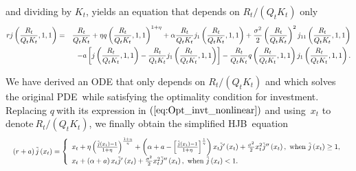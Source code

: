 \documentclass[12pt, a4paper]{article}
\begin{document}
and dividing by $K_{t}$, yields an equation that depends on $R_{t}/\left( Q_{t}K_{t}\right) $ only
{ \footnotesize
\begin{eqnarray*}
rj\left( \frac{R_{t}}{Q_{t}K_{t}},1,1\right)  &=&\frac{R_{t}}{Q_{t}K_{t}}%
+\eta q\left( \frac{R_{t}}{Q_{t}K_{t}},1,1\right) ^{1+\eta }+\alpha \frac{%
R_{t}}{Q_{t}K_{t}}j_{1}\left( \frac{R_{t}}{Q_{t}K_{t}},1,1\right) +\frac{%
\sigma ^{2}}{2}\left( \frac{R_{t}}{Q_{t}K_{t}}\right) ^{2}j_{11}\left( \frac{%
R_{t}}{Q_{t}K_{t}},1,1\right)  \\
&&-a\left[ j\left( \frac{R_{t}}{Q_{t}K_{t}},1,1\right) -\frac{R_{t}}{%
Q_{t}K_{t}}j_{1}\left( \frac{R_{t}}{Q_{t}K_{t}},1,1\right) \right] -\frac{%
R_{t}}{Q_{t}K_{t}}q\left( \frac{R_{t}}{Q_{t}K_{t}},1,1\right) j_{1}\left(
\frac{R_{t}}{Q_{t}K_{t}},1,1\right) .
\end{eqnarray*}
}

We have derived an ODE that only depends on $R_{t}/\left( Q_{t}K_{t}\right) $
and which solves the original PDE\ while satisfying the optimality condition
for investment. Replacing $q\ $with its expression in $\left( \ref%
{eq:Opt_invt_nonlinear}\right) $ and using\ $x_{t}$ to denote$\ R_{t}/\left(
Q_{t}K_{t}\right) $, we finally obtain the simplified HJB\ equation%
\begin{equation*}
\resizebox{\textwidth}{!}
{$
\left( r+a\right) \tilde{j}\left( x_{t}\right) =\left\{
\begin{array}{l}
x_{t}+\eta \left( \frac{\tilde{j}\left( x_{t}\right) -1}{1+\eta }\right) ^{%
\frac{1+\eta }{\eta }}+\left( \alpha +a-\left[ \frac{\tilde{j}\left(
x_{t}\right) -1}{1+\eta }\right] ^{\frac{1}{\eta }}\right) x_{t}\tilde{j}%
^{\prime }\left( x_{t}\right) +\frac{\sigma ^{2}}{2}x_{t}^{2}\tilde{j}%
^{\prime \prime }\left( x_{t}\right) ,\ \text{when }\tilde{j}\left(
x_{t}\right) \geq 1, \\
x_{t}+\left( \alpha +a\right) x_{t}\tilde{j}^{\prime }\left( x_{t}\right) +%
\frac{\sigma ^{2}}{2}x_{t}^{2}\tilde{j}^{\prime \prime }\left( x_{t}\right)
,\ \text{when }\tilde{j}\left( x_{t}\right) <1.%
\end{array}%
\right.
$}
\end{equation*}
\end{document}
